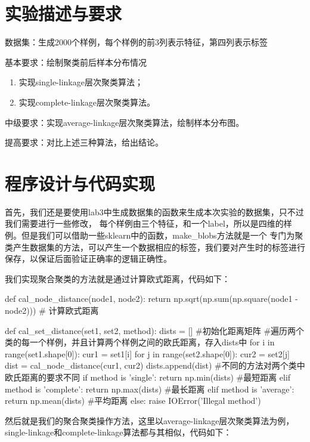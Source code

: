 \documentclass[UTF8,a4paper,10pt]{ctexart}
\begin{document}
\section{实验描述与要求}
数据集：生成2000个样例，每个样例的前3列表示特征，第四列表示标签

基本要求：绘制聚类前后样本分布情况

\begin{enumerate}
    \item 实现single-linkage层次聚类算法；
    \item 实现complete-linkage层次聚类算法。
\end{enumerate}

中级要求：实现average-linkage层次聚类算法，绘制样本分布图。

提高要求：对比上述三种算法，给出结论。

\section{程序设计与代码实现}
首先，我们还是要使用lab3中生成数据集的函数来生成本次实验的数据集，只不过我们需要进行一些修改，
每个样例由三个特征，和一个label，所以是四维的样例。但是我们可以借助一些sklearn中的函数，make\_blobs方法就是一个
专门为聚类产生数据集的方法，可以产生一个数据相应的标签，我们要对产生时的标签进行保存，以保证后面验证正确率的逻辑正确性。

我们实现聚合聚类的方法就是通过计算欧式距离，代码如下：

\begin{python}
def cal_node_distance(node1, node2):
    return np.sqrt(np.sum(np.square(node1 - node2)))  # 计算欧式距离

def cal_set_distance(set1, set2, method):
    dists = []  #初始化距离矩阵
    #遍历两个类的每一个样例，并且计算两个样例之间的欧氏距离，存入dists中
    for i in range(set1.shape[0]):
        cur1 = set1[i]
        for j in range(set2.shape[0]):
            cur2 = set2[j]
            dist = cal_node_distance(cur1, cur2)
            dists.append(dist)
    #不同的方法对两个类中欧氏距离的要求不同
    if method is 'single':
        return np.min(dists)  #最短距离
    elif method is 'complete':
        return np.max(dists)  #最长距离
    elif method is 'average':
        return np.mean(dists) #平均距离
    else:
        raise IOError('Illegal method')
\end{python}

然后就是我们的聚合聚类操作方法，这里以average-linkage层次聚类算法为例，single-linkage和complete-linkage算法都与其相似，代码如下：
\end{document}
